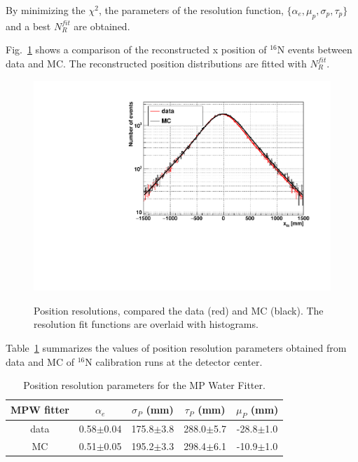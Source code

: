 By minimizing the $\chi^2$, the parameters of the resolution function, $\{\alpha_e,\mu_p,\sigma_p,\tau_p\}$ and a best $N_R^{fit}$ are obtained.

Fig.~\ref{posresol} shows a comparison of the reconstructed x position of {$^{16}$}N events between data and MC. The reconstructed position distributions are fitted with $N_R^{fit}$.


\begin{figure}
	\centering
	\includegraphics[width=140mm]{posResol.pdf}\label{posresol}
	\caption{Position resolutions, compared the data (red) and MC (black). The resolution fit functions are overlaid with histograms.}
\end{figure}

Table~\ref{table_posresol} summarizes the values of position resolution parameters obtained from data and MC of {$^{16}$}N calibration runs at the detector center.
\vspace{1mm}
\begin{table}[ht]
	\centering
	\caption{Position resolution parameters for the MP Water Fitter.}
	\label{table_posresol}
	\begin{tabular}{ccccc}
		\toprule
		MPW fitter & $\alpha_e$ & $\sigma_P$ (mm) &  $\tau_P$ (mm)& $\mu_P$ (mm)\\
		\hline 
		data& 0.58$\pm$0.04 & 175.8$\pm$3.8 & 288.0$\pm$5.7 & -28.8$\pm$1.0\\	
		\hline 
		MC & 0.51$\pm$0.05 & 195.2$\pm$3.3 & 298.4$\pm$6.1 & -10.9$\pm$1.0\\
		\bottomrule
	\end{tabular}
\end{table}
\vspace{1mm}

